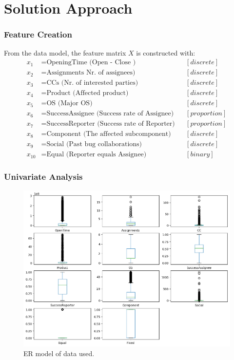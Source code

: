 \documentclass[xcolor=sgvnames,serifs,notes,compress,professionalfont]{beamer}
\begin{document}
\section{Solution Approach}
\begin{frame}
\frametitle{Feature Creation}
From the data model, the feature matrix $X$ is constructed with:
\begin{align*}
x_1 &= \text{OpeningTime (Open - Close )} && [discrete]\\
x_2 &= \text{Assignments Nr. of assignees)}&& [discrete]\\
x_3 &= \text{CCs (Nr. of interested parties)}&& [discrete]\\
x_4 &= \text{Product (Affected product)}&& [discrete]\\
x_5 &= \text{OS (Major OS)}&& [discrete]\\
x_6 &= \text{SuccessAssignee (Success rate of Assignee)}&& [proportion]\\
x_7 &= \text{SuccessReporter (Success rate of Reporter)}&& [proportion]\\
x_8 &= \text{Component (The affected subcomponent)}&& [discrete]\\
x_9 &= \text{Social (Past bug collaborations)}&& [discrete]\\
x_{10}&= \text{Equal (Reporter equals Assignee)} && [binary]
\end{align*}
\end{frame}

\begin{frame}
\frametitle{Univariate Analysis}
\begin{figure}
	\includegraphics[height=0.75\textheight]{pictures/boxplots.png}    
	\caption{ER model of data used.}
\end{figure}

\end{frame}
\end{document}
